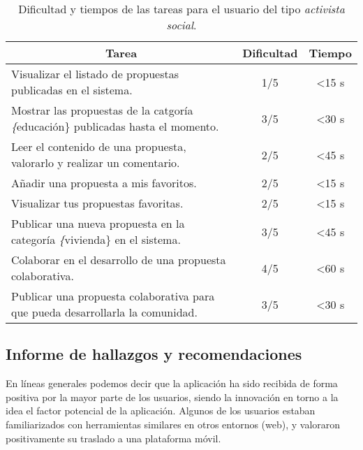 \begin{table}[!]
\centering
\caption{Dificultad y tiempos de las tareas para el usuario del tipo \textit{activista social}.}
\label{tableUserEvS}
\begin{tabular}{|m{9cm}|c|c|}
\hline
\multicolumn{1}{|c|}{{\bf Tarea}}                                                       & {\bf Dificultad} & {\bf Tiempo}   \\ \hline
Visualizar el listado de propuestas publicadas en el sistema.                           & 1/5              & \textless 15 s \\ \hline
Mostrar las propuestas de la catgoría \textit\{educación\} publicadas hasta el momento. & 3/5              & \textless 30 s \\ \hline
Leer el contenido de una propuesta, valorarlo y realizar un comentario.                 & 2/5              & \textless 45 s \\ \hline
Añadir una propuesta a mis favoritos.                                                   & 2/5              & \textless 15 s \\ \hline
Visualizar tus propuestas favoritas.                                                    & 2/5              & \textless 15 s \\ \hline
Publicar una nueva propuesta en la categoría \textit\{vivienda\} en el sistema.         & 3/5              & \textless 45 s \\ \hline
Colaborar en el desarrollo de una propuesta colaborativa.                               & 4/5              & \textless 60 s \\ \hline
Publicar una propuesta colaborativa para que pueda desarrollarla la comunidad.          & 3/5              & \textless 30 s \\ \hline
\end{tabular}
\end{table}

\subsection{Informe de hallazgos y recomendaciones}

En líneas generales podemos decir que la aplicación ha sido recibida de forma positiva por la mayor parte de los usuarios, siendo la innovación en torno a la idea el factor potencial de la aplicación. Algunos de los usuarios estaban familiarizados con herramientas similares en otros entornos (web), y valoraron positivamente su traslado a una plataforma móvil.

